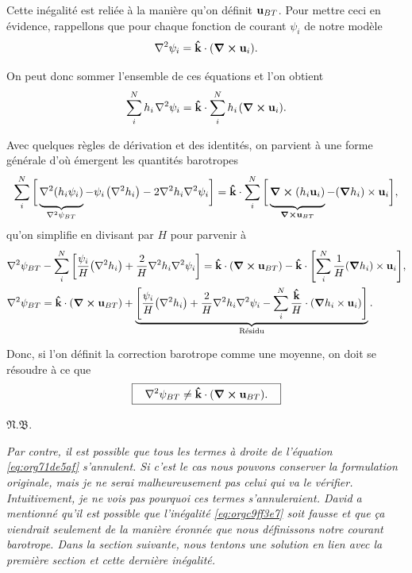 \documentclass[10pt]{article}
\numberwithin{equation}{section}
\newcommand{\kvf}{\vb{\hat{k}}}
\newcommand{\uu}{\vb{u}}
\newcommand{\grande}{\vphantom{\frac{1}{xx}}}
\newcommand{\pt}{\hspace{1pt}} %
\newcommand{\nb}{\underline{{\footnotesize\EightStarConvex}\pt $\mathfrak{N.B.}$\vphantom{p}}\hspace{3pt}}
\begin{document}
Cette inégalité est reliée à la manière qu'on définit \(\uu_{BT}\).
Pour mettre ceci en évidence, rappellons que pour chaque fonction de courant \(\psi_i\) de notre modèle
\begin{equation}
   \laplacian{\psi_i} = \kvf\cdot\qty(\curl{\uu_i}).
\end{equation}

On peut donc sommer l'ensemble de ces équations et l'on obtient
\begin{equation}
   \sum_i^Nh_i\pt\laplacian{\psi_i} = \kvf\cdot \sum_i^N h_i\pt \qty(\curl{\uu_i}).
\end{equation}

Avec quelques règles de dérivation et des identités, on parvient à une forme générale d'où émergent les quantités barotropes
\begin{align}
   \sum_i^N \bigg[ \underbrace{\grande\laplacian(h_i\psi_i)}_{\laplacian{\psi_{BT}}} - \psi_i\pt\qty(\laplacian{h_i}) - 2 \laplacian{h_i}\laplacian{\psi_i}\bigg]
    = \kvf\cdot \sum_i^N \bigg[ \underbrace{\grande\curl(h_i \uu_i)}_{\curl{\uu_{BT}}}  - \qty(\gradient{h_i})\times\uu_i\bigg],
\end{align}
qu'on simplifie en divisant par \(H\) pour parvenir à
\begin{align}
\label{eq:org71de5af}
   &\laplacian{\psi_{BT}} - \sum_i^N \bigg[ \frac{\psi_i}{H} \qty(\laplacian{h_i}) + \frac{2}{H} \laplacian{h_i}\laplacian{\psi_i}\bigg]
    = \kvf\cdot  \qty(\curl{ \uu_{BT}}) - \kvf\cdot \qty[\sum_i^N \frac{1}{H} \qty(\gradient{h_i})\times\uu_i],\nonumber\\
%
   &\laplacian{\psi_{BT}}
    = \kvf\cdot  \qty(\curl{ \uu_{BT}}) + \underbrace{\qty[ \frac{\psi_i}{H} \qty(\laplacian{h_i}) + \frac{2}{H} \laplacian{h_i}\laplacian{\psi_i}  -
\sum_i^N \frac{\kvf}{H}\cdot\qty(\gradient{h_i}\times\uu_i)]}_\text{Résidu}.
\end{align}

Donc, si l'on définit la correction barotrope comme une moyenne, on doit se résoudre à ce que
\begin{equation}
\label{eq:orgc9ff3e7}
   \boxed{\hspace{0.3cm}\laplacian{\psi_{BT}} \not= \kvf\cdot  \qty(\curl{ \uu_{BT}}).\hspace{0.3cm}}
\end{equation}

\nb\begin{minipage}[t]{0.9\linewidth}
\itshape Par contre, il est possible que tous les termes à droite de l'équation \ref{eq:org71de5af} s'annulent.
Si c'est le cas nous pouvons conserver la formulation originale, mais je ne serai malheureusement pas celui qui va le vérifier.
Intuitivement, je ne vois pas pourquoi ces termes s'annuleraient.
David a mentionné qu'il est possible que l'inégalité \ref{eq:orgc9ff3e7} soit fausse et que ça viendrait seulement de la manière éronnée que nous définissons notre courant barotrope.
Dans la section suivante, nous tentons une solution en lien avec la première section et cette dernière inégalité.
\end{minipage}
\end{document}
